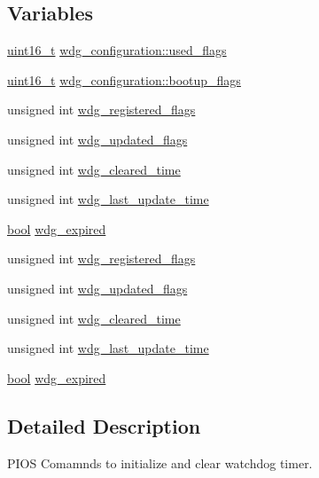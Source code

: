 \subsection*{Variables}
\begin{DoxyCompactItemize}
\item 
\hyperlink{stdint_8h_a273cf69d639a59973b6019625df33e30}{uint16\-\_\-t} \hyperlink{group___p_i_o_s___w_d_g_ga5256cc27a9d0a00ca6392a56ff3426e0}{wdg\-\_\-configuration\-::used\-\_\-flags}
\item 
\hyperlink{stdint_8h_a273cf69d639a59973b6019625df33e30}{uint16\-\_\-t} \hyperlink{group___p_i_o_s___w_d_g_ga52dc5a350735444a607b0dfd24d49371}{wdg\-\_\-configuration\-::bootup\-\_\-flags}
\item 
unsigned int \hyperlink{group___p_i_o_s___w_d_g_gaab238daf4f2906dc7691f92d408cee6c}{wdg\-\_\-registered\-\_\-flags}
\item 
unsigned int \hyperlink{group___p_i_o_s___w_d_g_ga37fde3d7139a4739308ac7a214dbe965}{wdg\-\_\-updated\-\_\-flags}
\item 
unsigned int \hyperlink{group___p_i_o_s___w_d_g_ga7916cddacca6aeceed27c3a2a5f238d2}{wdg\-\_\-cleared\-\_\-time}
\item 
unsigned int \hyperlink{group___p_i_o_s___w_d_g_gaf5d707b03121ce7360f560ebda3fd46b}{wdg\-\_\-last\-\_\-update\-\_\-time}
\item 
\hyperlink{group___exported__types_gaf6a258d8f3ee5206d682d799316314b1}{bool} \hyperlink{group___p_i_o_s___w_d_g_ga50e5c0c02e49b9be478e347b82eb7f2f}{wdg\-\_\-expired}
\item 
unsigned int \hyperlink{group___p_i_o_s___w_d_g_gaab238daf4f2906dc7691f92d408cee6c}{wdg\-\_\-registered\-\_\-flags}
\item 
unsigned int \hyperlink{group___p_i_o_s___w_d_g_ga37fde3d7139a4739308ac7a214dbe965}{wdg\-\_\-updated\-\_\-flags}
\item 
unsigned int \hyperlink{group___p_i_o_s___w_d_g_ga7916cddacca6aeceed27c3a2a5f238d2}{wdg\-\_\-cleared\-\_\-time}
\item 
unsigned int \hyperlink{group___p_i_o_s___w_d_g_gaf5d707b03121ce7360f560ebda3fd46b}{wdg\-\_\-last\-\_\-update\-\_\-time}
\item 
\hyperlink{group___exported__types_gaf6a258d8f3ee5206d682d799316314b1}{bool} \hyperlink{group___p_i_o_s___w_d_g_ga50e5c0c02e49b9be478e347b82eb7f2f}{wdg\-\_\-expired}
\end{DoxyCompactItemize}


\subsection{Detailed Description}
P\-I\-O\-S Comamnds to initialize and clear watchdog timer. 

